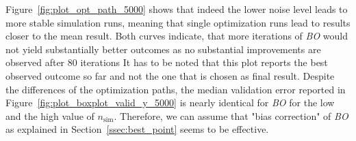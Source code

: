 \documentclass[bimj,fleqn]{w-art}
\theoremstyle{plain}
\theoremstyle{definition}
\begin{document}
Figure~\ref{fig:plot_opt_path_5000} shows that indeed the lower noise level leads to more stable simulation runs, meaning that single optimization runs lead to results closer to the mean result.
Both curves indicate, that more iterations of \emph{BO} would not yield substantially better outcomes as no substantial improvements are observed after 80 iterations
It has to be noted that this plot reports the best observed outcome so far and not the one that is chosen as final result.
Despite the differences of the optimization paths, the median validation error reported in Figure~\ref{fig:plot_boxplot_valid_y_5000} is nearly identical for \emph{BO} for the low and the high value of $n_\text{sim}$.
Therefore, we can assume that "bias correction" of \emph{BO} as explained in Section~\ref{ssec:best_point} seems to be effective.
\end{document}
